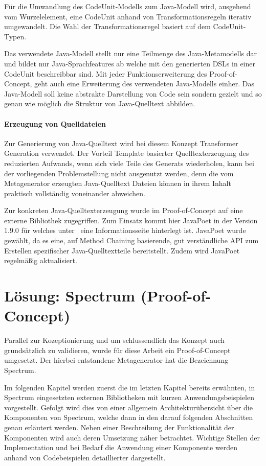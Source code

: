 \documentclass[12pt,oneside,a4paper,parskip]{scrbook}
\begin{document}
Für die Umwandlung des CodeUnit-Modells zum Java-Modell wird, ausgehend vom Wurzelelement, eine CodeUnit anhand von Transformationsregeln iterativ umgewandelt. Die Wahl der Transformationsregel basiert auf dem CodeUnit-Typen.

Das verwendete Java-Modell stellt nur eine Teilmenge des Java-Metamodells dar und bildet nur Java-Sprachfeatures ab welche mit den generierten DSLs in einer CodeUnit beschreibbar sind. Mit jeder Funktionserweiterung des Proof-of-Concept, geht auch eine Erweiterung des verwendeten Java-Modells einher. Das Java-Modell soll keine abstrakte Darstellung von Code sein sondern gezielt und so genau wie möglich die Struktur von Java-Quelltext abbilden.

\subsubsection{Erzeugung von Quelldateien}\label{sec:javagen}

Zur Generierung von Java-Quelltext wird bei diesem Konzept Transformer Generation verwendet. Der Vorteil Template basierter Quelltexterzeugung des reduzierten Aufwands, wenn sich viele Teile des Generats wiederholen, kann bei der vorliegenden Problemstellung nicht ausgenutzt werden, denn die vom Metagenerator erzeugten Java-Quelltext Dateien können in ihrem Inhalt praktisch vollständig voneinander abweichen.

Zur konkreten Java-Quelltexterzeugung wurde im Proof-of-Concept auf eine externe Bibliothek zugegriffen. Zum Einsatz kommt hier JavaPoet in der Version 1.9.0 für welches unter~\cite{javapoet2017} eine Informationsseite hinterlegt ist. JavaPoet wurde gewählt, da es eine, auf Method Chaining basierende, gut verständliche API zum Erstellen spezifischer Java-Quelltextteile bereitstellt. Zudem wird JavaPoet regelmäßig aktualisiert.

\chapter{Lösung: Spectrum (Proof-of-Concept)}

Parallel zur Kozeptionierung und um schlussendlich das Konzept auch grundsätzlich zu validieren, wurde für diese Arbeit ein Proof-of-Concept umgesetzt. Der hierbei entstandene Metagenerator hat die Bezeichnung Spectrum.

Im folgenden Kapitel werden zuerst die im letzten Kapitel bereits erwähnten, in Spectrum eingesetzten externen Bibliotheken mit kurzen Anwendungsbeispielen vorgestellt. Gefolgt wird dies von einer allgemein Architekturübersicht über die Komponenten von Spectrum, welche dann in den darauf folgenden Abschnitten genau erläutert werden. Neben einer Beschreibung der Funktionalität der Komponenten wird auch deren Umsetzung näher betrachtet. Wichtige Stellen der Implementation und bei Bedarf die Anwendung einer Komponente werden anhand von Codebeispielen detaillierter dargestellt.
\end{document}
